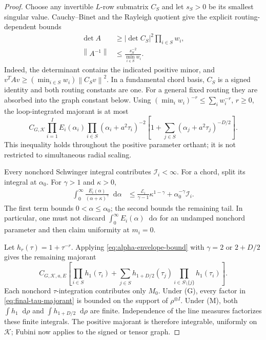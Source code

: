 \documentclass[final,5p,times,twocolumn,numbers,nopreprintline]{elsarticle}
\numberwithin{equation}{section}
\theoremstyle{definition}
\theoremstyle{remark}
\newcommand{\dd}{\mathop{}\!\mathrm d}
\newcommand{\norm}[1]{\left\lVert #1\right\rVert}
\newcommand{\Mzero}{M_0}
\begin{document}
\begin{proof}
Choose any invertible \(L\)-row submatrix \(C_S\) and let
\(s_S>0\) be its smallest singular value. Cauchy--Binet and the
Rayleigh quotient give the explicit routing-dependent bounds
\begin{equation}
\begin{aligned}
 \det A&\geq |\det C_S|^2\prod_{i\in S}w_i,\\
 \norm{A^{-1}}&\leq\frac{s_S^{-2}}{\min_{i\in S}w_i}.
\end{aligned}
 \label{eq:chord-bounds}
\end{equation}
Indeed, the determinant contains the indicated positive minor, and
\(v^TAv\geq(\min_{i\in S}w_i)\norm{C_Sv}^2\).
In a fundamental chord basis, \(C_S\) is a signed identity and
both routing constants are one. For a general fixed routing they
are absorbed into the graph constant below.
Using
\((\min_iw_i)^{-r}\leq\sum_iw_i^{-r}\), \(r\geq0\),
the loop-integrated majorant is at most
\begin{equation}
 C_{G,\mathcal K}\prod_{i=1}^IE_i(\alpha_i)
  \prod_{i\in S}(\alpha_i+a^2\tau_i)^{-2}
 \left[1+\sum_{j\in S}
             (\alpha_j+a^2\tau_j)^{-D/2}\right].
 \label{eq:parameter-majorant}
\end{equation}
This inequality holds throughout the positive parameter orthant;
it is not restricted to simultaneous radial scaling.

Every nonchord Schwinger integral contributes
\(\mathcal I_i<\infty\). For a chord, split its integral at
\(\alpha_0\). For \(\gamma>1\) and \(\kappa>0\),
\begin{align}
 \int_0^\infty
  \frac{E_i(\alpha)}{(\alpha+\kappa)^\gamma}\dd\alpha
 &\leq\frac{\mathcal E_i}{\gamma-1}
           \kappa^{1-\gamma}
       +\alpha_0^{-\gamma}\mathcal I_i .
 \label{eq:alpha-envelope-bound}
\end{align}
The first term bounds \(0<\alpha\leq\alpha_0\); the second bounds
the remaining tail. In particular, one must not discard
\(\int_0^\infty E_i(\alpha)\dd\alpha\) for an undamped nonchord
parameter and then claim uniformity at \(m_i=0\).

Let \(h_r(\tau)=1+\tau^{-r}\). Applying
\eqref{eq:alpha-envelope-bound} with
\(\gamma=2\) or \(2+D/2\) gives the remaining majorant
\begin{equation}
 C_{G,\mathcal K,a,E}\left[
   \prod_{i\in S}h_1(\tau_i)
  +\sum_{j\in S}h_{1+D/2}(\tau_j)
          \prod_{i\in S\setminus\{j\}}h_1(\tau_i)
 \right].
 \label{eq:final-tau-majorant}
\end{equation}
Each nonchord \(\tau\)-integration contributes only \(\Mzero\).
Under (G), every factor in \eqref{eq:final-tau-majorant} is bounded
on the support of \(\rho^{\otimes I}\). Under (M), both
\(\int h_1\dd\rho\) and
\(\int h_{1+D/2}\dd\rho\) are finite. Independence of the line
measures factorizes these finite integrals. The positive majorant is
therefore integrable, uniformly on \(\mathcal K\); Fubini now applies to the
signed or tensor graph.
\end{proof}
\end{document}
